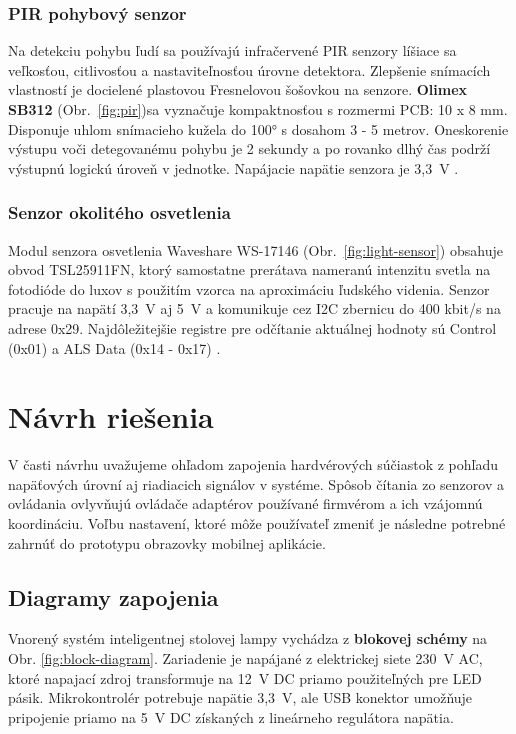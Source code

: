 \documentclass[12pt, a4paper]{article}
\begin{document}
\subsubsection{PIR pohybový senzor}
Na detekciu pohybu ľudí sa používajú infračervené PIR senzory líšiace sa veľkosťou, citlivosťou a nastaviteľnosťou úrovne detektora. Zlepšenie snímacích vlastností je docielené plastovou Fresnelovou šošovkou na senzore. \textbf{Olimex SB312} (Obr.~\ref{fig:pir})sa vyznačuje kompaktnosťou s rozmermi PCB: 10 x 8 mm. Disponuje uhlom snímacieho kužela do 100° s dosahom 3 - 5 metrov. Oneskorenie výstupu voči detegovanému pohybu je 2 sekundy a po rovanko dlhý čas podrží výstupnú logickú úroveň v jednotke. Napájacie napätie senzora je 3,3~V \cite{olimex_pir-sb312_nodate}.

\subsubsection{Senzor okolitého osvetlenia}
Modul senzora osvetlenia Waveshare WS-17146 (Obr.~\ref{fig:light-sensor}) obsahuje obvod TSL25911FN, ktorý samostatne prerátava nameranú intenzitu svetla na fotodióde do luxov s použitím vzorca na aproximáciu ľudského videnia. Senzor pracuje na napätí 3,3~V aj 5~V a komunikuje cez I2C zbernicu do 400 kbit/s na adrese 0x29. Najdôležitejšie registre pre odčítanie aktuálnej hodnoty sú Control (0x01) a ALS Data (0x14 - 0x17) \cite{noauthor_tsl25911_nodate}.

\section{Návrh riešenia}
V časti návrhu uvažujeme ohľadom zapojenia hardvérových súčiastok z pohľadu napäťových úrovní aj riadiacich signálov v systéme. Spôsob čítania zo senzorov a ovládania ovlyvňujú ovládače adaptérov používané firmvérom a ich vzájomnú koordináciu. Voľbu nastavení, ktoré môže používateľ zmeniť je následne potrebné zahrnúť do prototypu obrazovky mobilnej aplikácie.

\subsection{Diagramy zapojenia}
Vnorený systém inteligentnej stolovej lampy vychádza z \textbf{blokovej schémy} na Obr. \ref{fig:block-diagram}. Zariadenie je napájané z elektrickej siete 230~V AC, ktoré napajací zdroj transformuje na 12~V DC priamo použiteľných pre LED pásik. Mikrokontrolér potrebuje napätie 3,3~V, ale USB konektor umožňuje pripojenie priamo na 5~V DC získaných z lineárneho regulátora napätia.
\end{document}
